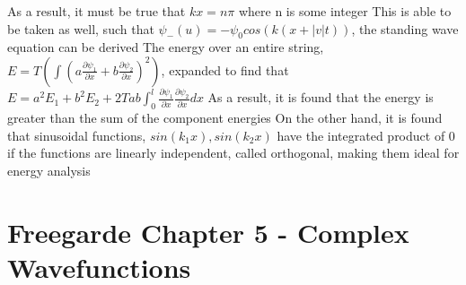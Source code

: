 \documentclass[11 pt, twoside]{article}
\newenvironment{outline*}
{
	\begin{outline}[enumerate]
	}
	{\end{outline}
}
\begin{document}
\begin{outline*}
\4 As a result, it must be true that $kx = n\pi$ where n is some integer
\4 This is able to be taken as well, such that $\psi_-(u) = -\psi_0 cos(k(x + |v|t))$, the standing wave equation can be derived
\2 The energy over an entire string, $E = T(\int (a\frac{\partial \psi_1}{\partial x} + b\frac{\partial \psi_2}{\partial x})^2)$, expanded to find that $E = a^2E_1 + b^2E_2 + 2Tab\int^l_0 \frac{\partial \psi_1}{\partial x}\frac{\partial \psi_2}{\partial x}dx$
\3 As a result, it is found that the energy is greater than the sum of the component energies
\3 On the other hand, it is found that sinusoidal functions, $sin(k_1x), sin(k_2x)$ have the integrated product of 0 if the functions are linearly independent, called orthogonal, making them ideal for energy analysis
\end{outline*}
\section{Freegarde Chapter 5 - Complex Wavefunctions}
\end{document}

